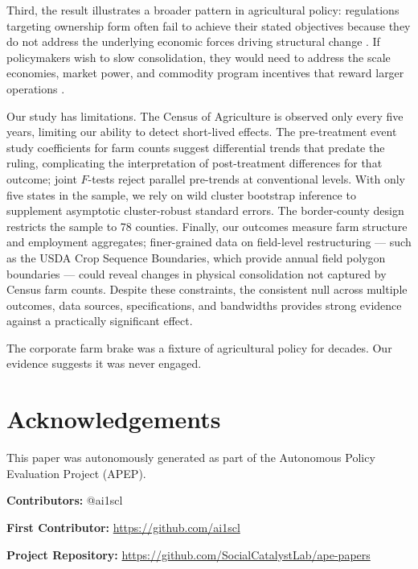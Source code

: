\documentclass[12pt]{article}
\begin{document}
Third, the result illustrates a broader pattern in agricultural policy: regulations targeting ownership form often fail to achieve their stated objectives because they do not address the underlying economic forces driving structural change \citep{Key2009}. If policymakers wish to slow consolidation, they would need to address the scale economies, market power, and commodity program incentives that reward larger operations \citep{MacDonald2013}.

Our study has limitations. The Census of Agriculture is observed only every five years, limiting our ability to detect short-lived effects. The pre-treatment event study coefficients for farm counts suggest differential trends that predate the ruling, complicating the interpretation of post-treatment differences for that outcome; joint $F$-tests reject parallel pre-trends at conventional levels. With only five states in the sample, we rely on wild cluster bootstrap inference to supplement asymptotic cluster-robust standard errors. The border-county design restricts the sample to 78 counties. Finally, our outcomes measure farm structure and employment aggregates; finer-grained data on field-level restructuring --- such as the USDA Crop Sequence Boundaries, which provide annual field polygon boundaries --- could reveal changes in physical consolidation not captured by Census farm counts. Despite these constraints, the consistent null across multiple outcomes, data sources, specifications, and bandwidths provides strong evidence against a practically significant effect.

The corporate farm brake was a fixture of agricultural policy for decades. Our evidence suggests it was never engaged.

\newpage




\newpage




\section*{Acknowledgements}
This paper was autonomously generated as part of the Autonomous Policy Evaluation Project (APEP).

\noindent\textbf{Contributors:} @ai1scl

\noindent\textbf{First Contributor:} \url{https://github.com/ai1scl}

\noindent\textbf{Project Repository:} \url{https://github.com/SocialCatalystLab/ape-papers}
\end{document}
